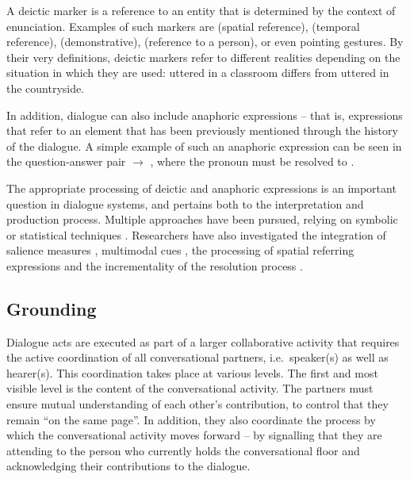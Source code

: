 A deictic marker is a reference to an entity that is determined by the context of enunciation.  Examples of such markers are  (spatial reference),  (temporal reference),  (demonstrative),  (reference to a person), or even pointing gestures. By their very definitions, deictic markers refer to different realities depending on the situation in which they are used:  uttered in a classroom differs from  uttered in the countryside.  

In addition, dialogue can also include anaphoric expressions -- that is, expressions that refer to an element that has been previously mentioned through the history of the dialogue. A simple example of such an anaphoric expression can be seen in the question-answer pair  $\rightarrow$ , where the pronoun  must be resolved to . 

The appropriate processing of deictic and anaphoric expressions is an important question in dialogue systems, and pertains both to the interpretation and production process. Multiple approaches have been pursued, relying on symbolic \citep{Eckert2000} or statistical techniques \citep{StrubeM03,Stent2010}.  Researchers have also investigated the integration of salience measures \citep{Kelleher:2004}, multimodal cues \citep{Frampton:2009,Chen:2011}, the processing of spatial referring expressions \citep{zender/etal:2009-ijcai} and the incrementality of the resolution process \citep{schlangen2009incremental,poesio2011incremental}. 

\subsection{Grounding}

Dialogue acts are executed as part of a larger collaborative activity that requires the active coordination of all conversational partners, i.e.\ speaker(s) as well as hearer(s).  This coordination takes place at various levels.  The first and most visible level is the content of the conversational activity.   The partners must ensure mutual understanding of each other's contribution, to control that they remain ``on the same page''.  In addition, they  also coordinate the process by which the conversational activity moves forward -- by signalling that they are attending to the person who currently holds the conversational floor and acknowledging their contributions to the dialogue.

